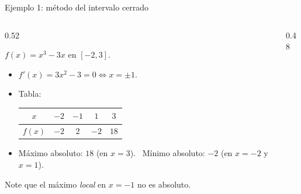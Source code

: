 \documentclass[10pt,aspectratio=169]{beamer}
\begin{document}
\begin{frame}{Ejemplo 1: método del intervalo cerrado}
  \begin{columns}
    \begin{column}{0.52\textwidth}
      \begin{ejemplo}
        $f(x)=x^3-3x$ en $[-2,3]$.
        \begin{itemize}
          \item $f'(x)=3x^2-3=0\iff x=\pm1$.
          \item Tabla:
            \begin{center}
              \begin{tabular}{c|cccc}
                $x$ & $-2$ & $-1$ & $1$ & $3$\\ \hline
                $f(x)$ & $-2$ & $2$ & $-2$ & $18$
              \end{tabular}
            \end{center}
          \item Máximo absoluto: $18$ (en $x=3$). \ Mínimo absoluto: $-2$ (en $x=-2$ y $x=1$).
        \end{itemize}
      \end{ejemplo}
      \small Note que el máximo \emph{local} en $x=-1$ no es absoluto.
    \end{column}
    \begin{column}{0.48\textwidth}
      \centering
    \end{column}
  \end{columns}
\end{frame}
\end{document}
